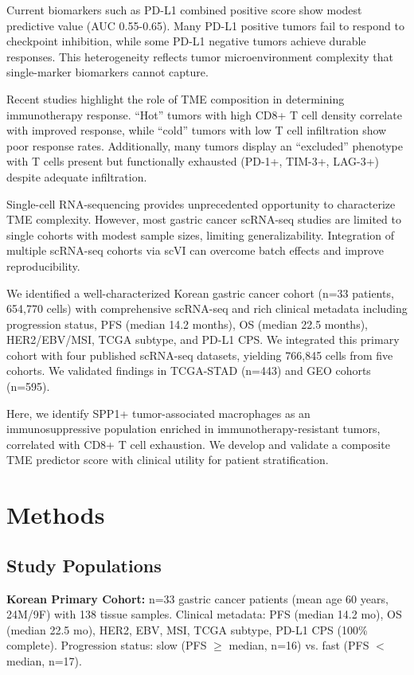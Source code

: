 \documentclass[12pt,twoside]{article}
\begin{document}
Current biomarkers such as PD-L1 combined positive score show modest predictive value (AUC 0.55-0.65). Many PD-L1 positive tumors fail to respond to checkpoint inhibition, while some PD-L1 negative tumors achieve durable responses. This heterogeneity reflects tumor microenvironment complexity that single-marker biomarkers cannot capture.

Recent studies highlight the role of TME composition in determining immunotherapy response. ``Hot'' tumors with high CD8+ T cell density correlate with improved response, while ``cold'' tumors with low T cell infiltration show poor response rates. Additionally, many tumors display an ``excluded'' phenotype with T cells present but functionally exhausted (PD-1+, TIM-3+, LAG-3+) despite adequate infiltration.

Single-cell RNA-sequencing provides unprecedented opportunity to characterize TME complexity. However, most gastric cancer scRNA-seq studies are limited to single cohorts with modest sample sizes, limiting generalizability. Integration of multiple scRNA-seq cohorts via scVI can overcome batch effects and improve reproducibility.

We identified a well-characterized Korean gastric cancer cohort (n=33 patients, 654,770 cells) with comprehensive scRNA-seq and rich clinical metadata including progression status, PFS (median 14.2 months), OS (median 22.5 months), HER2/EBV/MSI, TCGA subtype, and PD-L1 CPS. We integrated this primary cohort with four published scRNA-seq datasets, yielding 766,845 cells from five cohorts. We validated findings in TCGA-STAD (n=443) and GEO cohorts (n=595).

Here, we identify SPP1+ tumor-associated macrophages as an immunosuppressive population enriched in immunotherapy-resistant tumors, correlated with CD8+ T cell exhaustion. We develop and validate a composite TME predictor score with clinical utility for patient stratification.

\section{Methods}

\subsection{Study Populations}

\textbf{Korean Primary Cohort:} n=33 gastric cancer patients (mean age 60 years, 24M/9F) with 138 tissue samples. Clinical metadata: PFS (median 14.2 mo), OS (median 22.5 mo), HER2, EBV, MSI, TCGA subtype, PD-L1 CPS (100\% complete). Progression status: slow (PFS $\geq$ median, n=16) vs. fast (PFS $<$ median, n=17).
\end{document}
